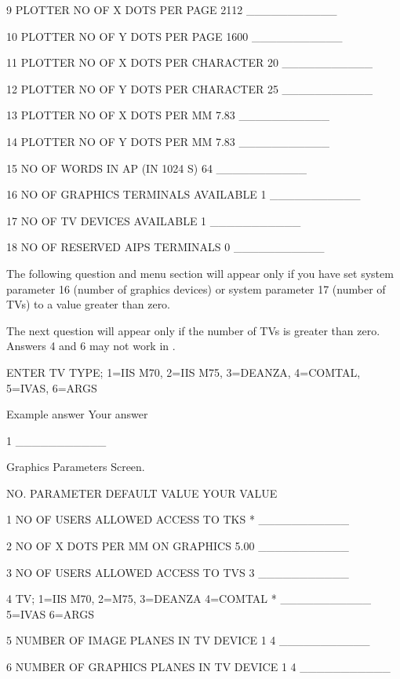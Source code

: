9    PLOTTER NO OF X DOTS PER PAGE         2112       ___________

10   PLOTTER NO OF Y DOTS PER PAGE         1600       ___________

11   PLOTTER NO OF X DOTS PER CHARACTER    20         ___________

12   PLOTTER NO OF Y DOTS PER CHARACTER    25         ___________

13   PLOTTER NO OF X DOTS PER MM           7.83       ___________

14   PLOTTER NO OF Y DOTS PER MM           7.83       ___________

15   NO OF WORDS IN AP (IN 1024 S)         64         ___________

16   NO OF GRAPHICS TERMINALS AVAILABLE    1          ___________

17   NO OF TV DEVICES AVAILABLE            1          ___________

18   NO OF RESERVED AIPS TERMINALS         0          ___________
\endfortran\medskip

The following question and menu section will appear only if you have
set system parameter 16 (number of graphics devices) or system
parameter 17 (number of TVs) to a value greater than zero.

The next question will appear only if the number of TVs is greater than
zero.  Answers 4 and 6 may not work in \THISVER.\medskip

\fortran
ENTER TV TYPE; 1=IIS M70, 2=IIS M75, 3=DEANZA, 4=COMTAL,
               5=IVAS, 6=ARGS

Example answer          Your answer

1                       ___________

Graphics Parameters Screen.

NO.  PARAMETER                    DEFAULT  VALUE        YOUR VALUE

1   NO OF USERS ALLOWED ACCESS TO TKS          *        ___________

2   NO OF X DOTS PER MM ON GRAPHICS            5.00     ___________

3   NO OF USERS ALLOWED ACCESS TO TVS          3        ___________

4   TV; 1=IIS M70, 2=M75, 3=DEANZA 4=COMTAL    *        ___________
    5=IVAS 6=ARGS

5   NUMBER OF IMAGE PLANES IN TV DEVICE 1      4        ___________

6   NUMBER OF GRAPHICS PLANES IN TV DEVICE 1   4        ___________
\endfortran\medskip

